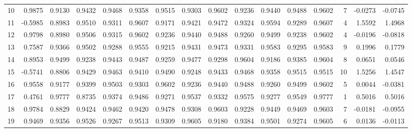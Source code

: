 \begin{tabular}{lrrrrrrrrrrrrrrr}
10 &      0.9875 &  0.9130 &  0.9432 &  0.9468 &  0.9358 &  0.9515 &  0.9303 &  0.9602 &  0.9236 &  0.9440 &   0.9488 &     0.9602 &      7 &                   -0.0273 &                    -0.0745 \\
11 &     -0.5985 &  0.8983 &  0.9510 &  0.9311 &  0.9607 &  0.9171 &  0.9421 &  0.9472 &  0.9324 &  0.9594 &   0.9289 &     0.9607 &      4 &                    1.5592 &                     1.4968 \\
12 &      0.9798 &  0.8980 &  0.9506 &  0.9315 &  0.9602 &  0.9236 &  0.9440 &  0.9488 &  0.9260 &  0.9499 &   0.9238 &     0.9602 &      4 &                   -0.0196 &                    -0.0818 \\
13 &      0.7587 &  0.9366 &  0.9502 &  0.9288 &  0.9555 &  0.9215 &  0.9431 &  0.9473 &  0.9331 &  0.9583 &   0.9295 &     0.9583 &      9 &                    0.1996 &                     0.1779 \\
14 &      0.8953 &  0.9499 &  0.9238 &  0.9443 &  0.9487 &  0.9259 &  0.9477 &  0.9298 &  0.9604 &  0.9186 &   0.9385 &     0.9604 &      8 &                    0.0651 &                     0.0546 \\
15 &     -0.5741 &  0.8806 &  0.9429 &  0.9463 &  0.9410 &  0.9490 &  0.9248 &  0.9433 &  0.9468 &  0.9358 &   0.9515 &     0.9515 &     10 &                    1.5256 &                     1.4547 \\
16 &      0.9558 &  0.9177 &  0.9399 &  0.9503 &  0.9303 &  0.9602 &  0.9236 &  0.9440 &  0.9488 &  0.9260 &   0.9499 &     0.9602 &      5 &                    0.0044 &                    -0.0381 \\
17 &      0.4761 &  0.9777 &  0.8735 &  0.9374 &  0.9486 &  0.9271 &  0.9537 &  0.9332 &  0.9575 &  0.9277 &   0.9549 &     0.9777 &      1 &                    0.5016 &                     0.5016 \\
18 &      0.9784 &  0.8829 &  0.9424 &  0.9462 &  0.9420 &  0.9478 &  0.9308 &  0.9603 &  0.9228 &  0.9449 &   0.9469 &     0.9603 &      7 &                   -0.0181 &                    -0.0955 \\
19 &      0.9469 &  0.9356 &  0.9526 &  0.9267 &  0.9513 &  0.9309 &  0.9605 &  0.9180 &  0.9384 &  0.9501 &   0.9274 &     0.9605 &      6 &                    0.0136 &                    -0.0113 \\
\bottomrule
\end{tabular}

